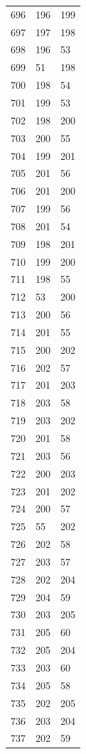 \documentclass[a4paper,11pt]{article}
\begin{document}
\begin{center}
\begin{longtable}{|R{1.5cm}|R{1.5cm}|R{1.5cm}|}
  696 &  196 &  199 \\
  697 &  197 &  198 \\
  698 &  196 &   53 \\
  699 &   51 &  198 \\
  700 &  198 &   54 \\
  701 &  199 &   53 \\
  702 &  198 &  200 \\
  703 &  200 &   55 \\
  704 &  199 &  201 \\
  705 &  201 &   56 \\
  706 &  201 &  200 \\
  707 &  199 &   56 \\
  708 &  201 &   54 \\
  709 &  198 &  201 \\
  710 &  199 &  200 \\
  711 &  198 &   55 \\
  712 &   53 &  200 \\
  713 &  200 &   56 \\
  714 &  201 &   55 \\
  715 &  200 &  202 \\
  716 &  202 &   57 \\
  717 &  201 &  203 \\
  718 &  203 &   58 \\
  719 &  203 &  202 \\
  720 &  201 &   58 \\
  721 &  203 &   56 \\
  722 &  200 &  203 \\
  723 &  201 &  202 \\
  724 &  200 &   57 \\
  725 &   55 &  202 \\
  726 &  202 &   58 \\
  727 &  203 &   57 \\
  728 &  202 &  204 \\
  729 &  204 &   59 \\
  730 &  203 &  205 \\
  731 &  205 &   60 \\
  732 &  205 &  204 \\
  733 &  203 &   60 \\
  734 &  205 &   58 \\
  735 &  202 &  205 \\
  736 &  203 &  204 \\
  737 &  202 &   59 \\

\end{longtable}
\end{center}
\end{document}
